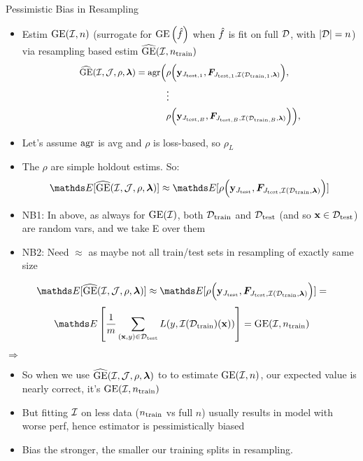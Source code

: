 \documentclass[11pt,compress,t,notes=noshow, xcolor=table]{beamer}
\begin{document}
\begin{vbframe}{Pessimistic Bias in Resampling}
\begin{itemize}
    \item Estim $\GE(\ind, n)$ (surrogate for $\GEf$ when $\fh$ is fit on full $\D$, with $|\D|=n$) via resampling based estim
        $\GEh(\ind, \ntrain)$
\begin{equation*}
\small
\begin{split}
\GEhresa = \agr\Big(
 &\rho\Big(\yv_{\Jtesti[1]}, \FJtestftraini[1]\Big), \\ &\large{\vdots} \\
& \rho\Big(\yv_{\Jtesti[B]}, \FJtestftraini[B]\Big)
    \Big),
\end{split}
\end{equation*}
\item Let's assume $\agr$ is avg and $\rho$ is loss-based, so $\rho_L$ 
\item The $\rho$ are simple holdout estims. So:
$$\E[\GEhresa] \approx \E[\rho\Big(\yv_{\Jtest}, \FJtestftrain\Big)] $$
\end{itemize}

\begin{itemize}
    \footnotesize
\item NB1: In above, as always for $\GE(\ind)$, both $\Dtrain$ and $\Dtest$ (and so $\xv \in \Dtest$) are random vars, and we take E over them 
\item NB2: Need $\approx$ as maybe not all train/test sets in resampling of exactly same size
\end{itemize}

\framebreak


\framebreak

$$\E[\GEhresa] \approx \E[\rho\Big(\yv_{\Jtest}, \FJtestftrain\Big)] = $$
$$  \E \left[ \frac{1}{m} \sum_{\xy \in \Dtest} L(y, \ind(\Dtrain)(\xv)) \right] = \GE(\ind, \ntrain)$$



$\Rightarrow$

\begin{itemize}
    \item So when we use $\GEhresa$ to to estimate $\GE(\ind, n)$, our expected value is nearly correct, it's $\GE(\ind, \ntrain)$
    \item But fitting $\ind$ on less data ($\ntrain$ vs full $n$) usually results in model with worse perf, hence estimator is pessimistically biased 
    \item Bias the stronger, the smaller our training splits in resampling.
\end{itemize}
\end{vbframe}
\end{document}
